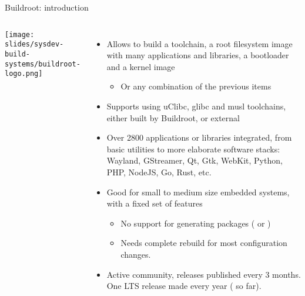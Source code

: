 \begin{frame}{Buildroot: introduction}
  \begin{columns}
    \texttt{[image: slides/sysdev-build-systems/buildroot-logo.png]}
    \begin{itemize}
    \item Allows to build a toolchain, a root filesystem image with many
      applications and libraries, a bootloader and a kernel image
      \begin{itemize}
      \item Or any combination of the previous items
      \end{itemize}
    \item Supports using uClibc, glibc and musl toolchains,
      either built by Buildroot, or external
    \item Over 2800 applications or libraries integrated, from basic
      utilities to more elaborate software stacks: Wayland, GStreamer, Qt,
      Gtk, WebKit, Python, PHP, NodeJS, Go, Rust, etc.
    \item Good for small to medium size embedded systems, with a fixed set of
      features
      \begin{itemize}
      \item No support for generating packages ( or
        )
      \item Needs complete rebuild for most configuration changes.
      \end{itemize}
    \item Active community, releases published every 3 months. One LTS
      release made every year ( so far).
    \end{itemize}
  \end{columns}
\end{frame}


